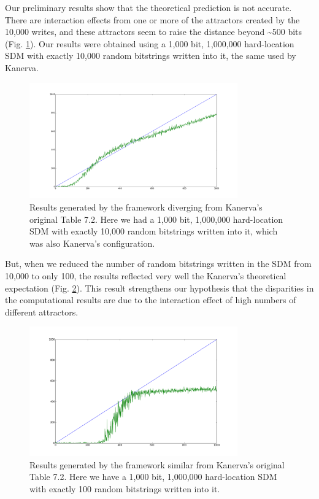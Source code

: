 Our preliminary results show that the theoretical prediction is not accurate.  There are interaction effects from one or more of the attractors created by the 10,000 writes, and these attractors seem to raise the distance beyond \textasciitilde 500 bits (Fig. \ref{sdm-10000w-table-7-2}). Our results were obtained using a 1,000 bit, 1,000,000 hard-location SDM with exactly 10,000 random bitstrings written into it, the same used by Kanerva.

\begin{figure}[h]
\centering\includegraphics[width=0.8\textwidth]{images02/sdm-10000w-table-7-2.png}
\caption{Results generated by the framework diverging from Kanerva's original Table 7.2. Here we had a 1,000 bit, 1,000,000 hard-location SDM with exactly 10,000 random bitstrings written into it, which was also Kanerva's configuration.
\label{sdm-10000w-table-7-2}}
\end{figure}

But, when we reduced the number of random bitstrings written in the SDM from 10,000 to only 100, the results reflected very well the Kanerva's theoretical expectation (Fig. \ref{sdm-100w-table-7-2}). This result strengthens our hypothesis that the disparities in the computational results are due to the interaction effect of high numbers of different attractors.

\begin{figure}[h]
\centering\includegraphics[width=0.8\textwidth]{images02/sdm-100w-table-7-2.png}
\caption{Results generated by the framework similar from Kanerva's original Table 7.2. Here we have a 1,000 bit, 1,000,000 hard-location SDM with exactly 100 random bitstrings written into it.
\label{sdm-100w-table-7-2}}
\end{figure}


